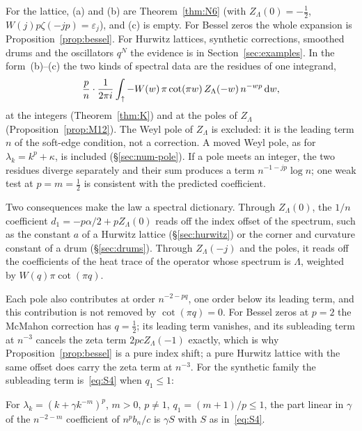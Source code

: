 For the lattice, (a) and (b) are Theorem~\ref{thm:N6} (with $Z_\Lambda(0)=-\frac12$, $W(j)p\zeta(-jp)=\varepsilon_j$), and (c)
is empty. For Bessel zeros the whole expansion is Proposition~\ref{prop:bessel}. For Hurwitz lattices, synthetic
corrections, smoothed drums and the oscillators $q^N$ the evidence is in Section~\ref{sec:examples}. In the form~(b)--(c) the
two kinds of spectral data are the residues of one integrand,
\[
  \frac pn\cdot\frac1{2\pi i}\int_{\uparrow}-W(w)\,\pi\cot(\pi w)\,Z_\Lambda(-w)\,n^{-wp}\,\mathrm{d} w ,
\]
at the integers (Theorem~\ref{thm:K}) and at the poles of $Z_\Lambda$ (Proposition~\ref{prop:M12}). The Weyl pole of
$Z_\Lambda$ is excluded: it is the leading term $n$ of the soft-edge condition, not a correction. A moved Weyl pole, as for
$\lambda_k=k^p+\kappa$, is included (\S\ref{sec:num-pole}). If a pole meets an integer, the two residues diverge separately
and their sum produces a term $n^{-1-jp}\log n$; one weak test at $p=m=\frac12$ is consistent with the predicted coefficient.

Two consequences make the law a spectral dictionary. Through $Z_\Lambda(0)$, the $1/n$ coefficient $d_1=-p\alpha/2+pZ_\Lambda(0)$
reads off the index offset of the spectrum, such as the constant $a$ of a Hurwitz lattice (\S\ref{sec:hurwitz}) or the
corner and curvature constant of a drum (\S\ref{sec:drums}). Through $Z_\Lambda(-j)$ and the poles, it reads off the
coefficients of the heat trace of the operator whose spectrum is $\Lambda$, weighted by $W(q)\pi\cot(\pi q)$.

\begin{remark}\label{rem:sublead}
Each pole also contributes at order $n^{-2-pq}$, one order below its leading term, and this contribution is not removed
by $\cot(\pi q)=0$. For Bessel zeros at $p=2$ the McMahon correction has $q=\frac12$; its leading term vanishes, and its
subleading term at $n^{-3}$ cancels the zeta term $2pcZ_\Lambda(-1)$ exactly, which is why Proposition~\ref{prop:bessel} is a
pure index shift; a pure Hurwitz lattice with the same offset does carry the zeta term at $n^{-3}$. For the synthetic
family the subleading term is~\eqref{eq:S4} when $q_1\le1$:
\end{remark}

\begin{conjecture}\label{conj:S4}
For $\lambda_k=(k+\gamma k^{-m})^p$, $m>0$, $p\ne1$, $q_1=(m+1)/p\le1$, the part linear in $\gamma$ of the $n^{-2-m}$ coefficient
of $n^pb_n/c$ is $\gamma S$ with $S$ as in~\eqref{eq:S4}.
\end{conjecture}

